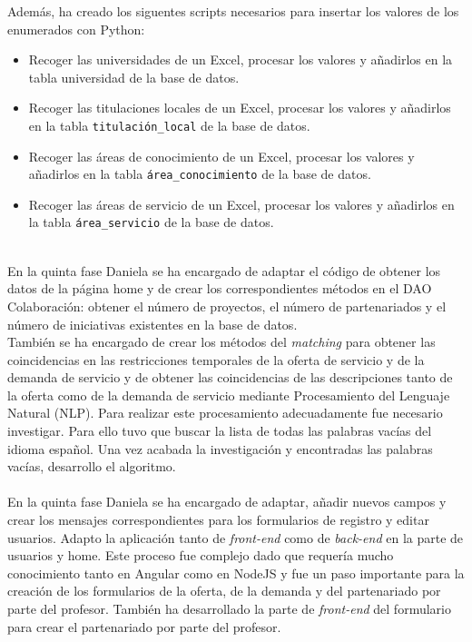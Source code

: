 \documentclass[11pt]{book}
\begin{document}
  Además, ha creado los siguentes scripts necesarios para insertar los valores de los enumerados con Python:
\begin{itemize} 
	\item Recoger las universidades de un Excel, procesar los valores y añadirlos en la tabla universidad de la base de datos.
	\item Recoger las titulaciones locales de un Excel, procesar los valores y añadirlos en la tabla \texttt{titulación\_local} de la base de datos.
	\item Recoger las áreas de conocimiento de un Excel, procesar los valores y añadirlos en la tabla \texttt{área\_conocimiento} de la base de datos.
	\item Recoger las áreas de servicio de un Excel, procesar los valores y añadirlos en la tabla \texttt{área\_servicio} de la base de datos.\\\\
\end{itemize}
En la quinta fase Daniela se ha encargado de adaptar el código de obtener los datos de la página home y de crear los correspondientes métodos en el DAO Colaboración: obtener el número de proyectos, el número de partenariados y el número de iniciativas existentes en la base de datos.\\ 
También se ha encargado de crear los métodos del \emph{matching} para obtener las coincidencias en las restricciones temporales de la oferta de servicio y de la demanda de servicio y de obtener las coincidencias de las descripciones tanto de la oferta como de la demanda de servicio mediante Procesamiento del Lenguaje Natural (NLP). Para realizar este procesamiento adecuadamente fue necesario investigar. Para ello tuvo que buscar la lista de todas las palabras vacías del idioma español. Una vez acabada la investigación y encontradas las palabras vacías, desarrollo el algoritmo.\\\\
En la quinta fase Daniela se ha encargado de adaptar, añadir nuevos campos y crear los mensajes correspondientes para los formularios de registro y editar usuarios. Adapto la aplicación tanto de \textit{front-end} como de \textit{back-end} en la parte de usuarios y home. Este proceso fue complejo dado que requería mucho conocimiento tanto en Angular como en NodeJS y fue un paso importante para la creación de los formularios de la oferta, de la demanda y del partenariado por parte del profesor. También ha desarrollado la parte de \textit{front-end} del formulario para crear el partenariado por parte del profesor.
\end{document}
